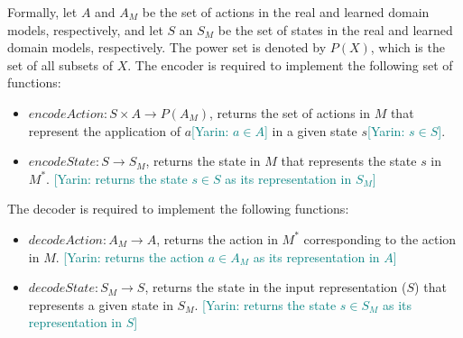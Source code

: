 \documentclass{article}
\theoremstyle{definition}
\theoremstyle{remark}
\newcommand{\realm}{\ensuremath{M^*}\xspace}
\newcommand{\yarin}[1]{{\textcolor{teal}{[Yarin: #1]}}}
\begin{document}
Formally, let $A$ and $A_M$ be the set of actions in the real and learned domain models, respectively, and let $S$ an $S_M$ be the set of states in the real and learned domain models, respectively. The power set is denoted by $P(X)$, which is the set of all subsets of $X$. 
The encoder is required to implement the following set of functions:
\begin{itemize}
    \item ${\mathit{encodeAction}: S\times A\rightarrow P(A_M)}$, returns the set of actions in $M$ that represent the application of $a$\yarin{$a \in A$} in a given state $s$\yarin{$s \in S$}. 
    \item ${\mathit{encodeState}: S\rightarrow S_M}$, returns the state in $M$ that represents the state $s$ in $\realm$. \yarin{returns the state $s \in S$ as its representation in $S_M$}
\end{itemize}
The decoder is required to implement the following functions:
\begin{itemize}
    \item ${\mathit{decodeAction}: A_M\rightarrow A}$, returns the action in $\realm$ corresponding to the action in $M$. \yarin{returns the action $a \in A_M$ as its representation in $A$}
    \item ${\mathit{decodeState}: S_M\rightarrow S}$, returns the state in the input representation ($S$) that represents a given state in $S_M$. \yarin{returns the state $s \in S_M$ as its representation in $S$}
\end{itemize}





    
    



\end{document}
